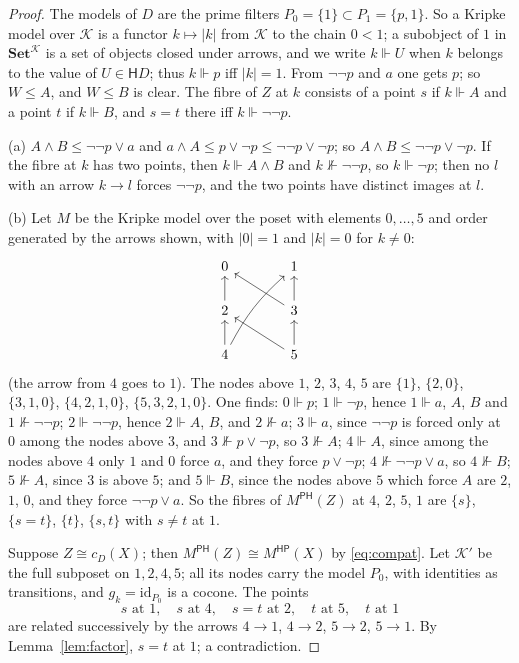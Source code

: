 \documentclass[11pt]{amsart}
\theoremstyle{definition}
\newcommand{\Set}{\mathbf{Set}}
\newcommand{\PP}{\mathsf P}
\newcommand{\HH}{\mathsf H}
\newcommand{\cK}{\mathcal K}
\begin{document}
\begin{proof}
The models of $D$ are the prime filters $P_0=\{1\}\subset P_1=\{p,1\}$.
So a Kripke model over $\cK$ is a functor $k\mapsto|k|$ from $\cK$ to
the chain $0<1$; a subobject of $1$ in $\Set^{\cK}$ is a set of objects
closed under arrows, and we write $k\Vdash U$ when $k$ belongs to the
value of $U\in\HH D$; thus $k\Vdash p$ iff $|k|=1$. From $\neg\neg p$
and $a$ one gets $p$; so $W\le A$, and $W\le B$ is clear. The fibre of
$Z$ at $k$ consists of a point $s$ if $k\Vdash A$ and a point $t$ if
$k\Vdash B$, and $s=t$ there iff $k\Vdash\neg\neg p$.

(a) $A\wedge B\le\neg\neg p\vee a$ and $a\wedge A\le p\vee\neg p\le
\neg\neg p\vee\neg p$; so $A\wedge B\le\neg\neg p\vee\neg p$. If the
fibre at $k$ has two points, then $k\Vdash A\wedge B$ and
$k\nVdash\neg\neg p$, so $k\Vdash\neg p$; then no $l$ with an arrow
$k\to l$ forces $\neg\neg p$, and the two points have distinct images
at $l$.

(b) Let $M$ be the Kripke model over the poset with elements
$0,\dots,5$ and order generated by the arrows shown, with $|0|=1$ and
$|k|=0$ for $k\ne0$:
\[
\begin{tikzcd}[column sep=large,row sep=normal]
0&1\\
2\arrow[u]&3\arrow[u]\arrow[ul]\\
4\arrow[u]\arrow[uur,bend left=10]&5\arrow[u]\arrow[ul]
\end{tikzcd}
\]
(the arrow from $4$ goes to $1$). The nodes above $1$, $2$, $3$, $4$,
$5$ are $\{1\}$, $\{2,0\}$, $\{3,1,0\}$, $\{4,2,1,0\}$,
$\{5,3,2,1,0\}$. One finds: $0\Vdash p$; $1\Vdash\neg p$, hence
$1\Vdash a$, $A$, $B$ and $1\nVdash\neg\neg p$; $2\Vdash\neg\neg p$,
hence $2\Vdash A$, $B$, and $2\nVdash a$; $3\Vdash a$, since
$\neg\neg p$ is forced only at $0$ among the nodes above $3$, and
$3\nVdash p\vee\neg p$, so $3\nVdash A$; $4\Vdash A$, since among the
nodes above $4$ only $1$ and $0$ force $a$, and they force $p\vee\neg
p$; $4\nVdash\neg\neg p\vee a$, so $4\nVdash B$; $5\nVdash A$, since
$3$ is above $5$; and $5\Vdash B$, since the nodes above $5$ which
force $A$ are $2$, $1$, $0$, and they force $\neg\neg p\vee a$. So the
fibres of $M^{\PP\HH}(Z)$ at $4$, $2$, $5$, $1$ are $\{s\}$, $\{s=t\}$,
$\{t\}$, $\{s,t\}$ with $s\ne t$ at $1$.

Suppose $Z\cong c_D(X)$; then $M^{\PP\HH}(Z)\cong M^{\HH\PP}(X)$ by
\eqref{eq:compat}. Let $\cK'$ be the full subposet on $1,2,4,5$; all
its nodes carry the model $P_0$, with identities as transitions, and
$g_k=\mathrm{id}_{P_0}$ is a cocone. The points
\[
s\text{ at }1,\quad s\text{ at }4,\quad s=t\text{ at }2,\quad
t\text{ at }5,\quad t\text{ at }1
\]
are related successively by the arrows $4\to1$, $4\to2$, $5\to2$,
$5\to1$. By Lemma~\ref{lem:factor}, $s=t$ at $1$; a contradiction.


\end{proof}
\end{document}
